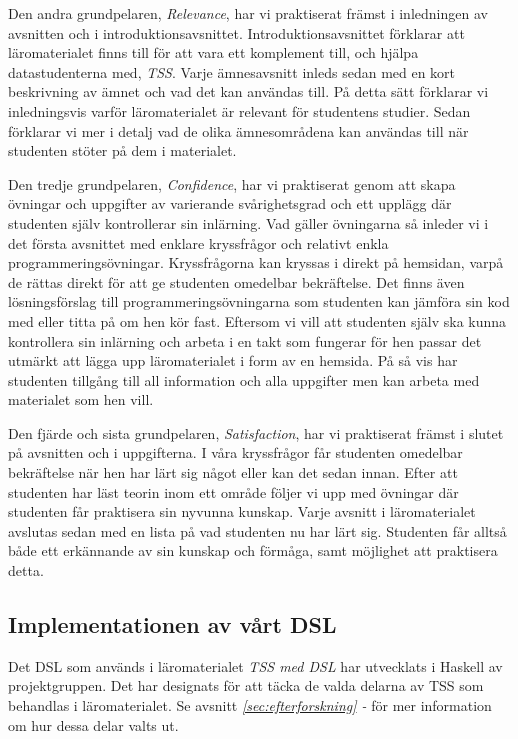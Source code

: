 \documentclass[12pt,a4paper,twoside,openright]{article}
\begin{document}
Den andra grundpelaren, \textit{Relevance}, har vi praktiserat främst
i inledningen av avsnitten och i
introduktionsavsnittet. Introduktionsavsnittet förklarar att
läromaterialet finns till för att vara ett komplement till, och hjälpa
datastudenterna med, \textit{TSS}. Varje ämnesavsnitt inleds sedan med
en kort beskrivning av ämnet och vad det kan användas till. På detta
sätt förklarar vi inledningsvis varför läromaterialet är relevant för
studentens studier. Sedan förklarar vi mer i detalj vad de olika
ämnesområdena kan användas till när studenten stöter på dem i
materialet.

Den tredje grundpelaren, \textit{Confidence}, har vi praktiserat genom
att skapa övningar och uppgifter av varierande svårighetsgrad och ett
upplägg där studenten själv kontrollerar sin inlärning. Vad gäller
övningarna så inleder vi i det första avsnittet med enklare
kryssfrågor och relativt enkla programmeringsövningar. Kryssfrågorna
kan kryssas i direkt på hemsidan, varpå de rättas direkt för att ge
studenten omedelbar bekräftelse. Det finns även lösningsförslag till
programmeringsövningarna som studenten kan jämföra sin kod med eller
titta på om hen kör fast. Eftersom vi vill att studenten själv ska
kunna kontrollera sin inlärning och arbeta i en takt som fungerar för
hen passar det utmärkt att lägga upp läromaterialet i form av en
hemsida. På så vis har studenten tillgång till all information och
alla uppgifter men kan arbeta med materialet som hen vill.

Den fjärde och sista grundpelaren, \textit{Satisfaction}, har vi
praktiserat främst i slutet på avsnitten och i uppgifterna. I våra
kryssfrågor får studenten omedelbar bekräftelse när hen har lärt sig
något eller kan det sedan innan. Efter att studenten har läst teorin
inom ett område följer vi upp med övningar där studenten får
praktisera sin nyvunna kunskap. Varje avsnitt i läromaterialet
avslutas sedan med en lista på vad studenten nu har lärt
sig. Studenten får alltså både ett erkännande av sin kunskap och
förmåga, samt möjlighet att praktisera detta.

\subsection{Implementationen av vårt DSL}
\label{sec:implDSL}
Det DSL som används i läromaterialet \textit{TSS med DSL} har
utvecklats i Haskell av projektgruppen. Det har designats för att
täcka de valda delarna av TSS som behandlas i läromaterialet. Se
avsnitt \textit{\ref{sec:efterforskning} -
  } för mer information om hur dessa delar
valts ut.
\end{document}
